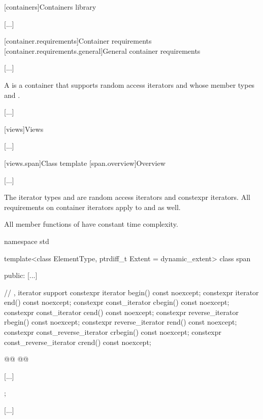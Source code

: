 
[containers]{Containers library}

[...]

\setcounter{section}{1}
[container.requirements]{Container requirements}
[container.requirements.general]{General container requirements}

[...]

\setcounter{Paras}{12}
\pnum
{}%
A 
is a container that supports random access iterators
and whose member types  and 
.

[...]

\setcounter{section}{6}
[views]{Views}

[...]

\setcounter{subsection}{2}
[views.span]{Class template }
[span.overview]{Overview}

[...]

\setcounter{Paras}{1}
\pnum
The iterator types  and  are
random access iterators and
constexpr iterators.
All requirements on container iterators apply to
 and  as well.

\pnum
All member functions of  have constant time complexity.

%
\begin{codeblock}
namespace std {
  template<class ElementType, ptrdiff_t Extent = dynamic_extent>
  class span {
  public:
    [...]

    // , iterator support
    constexpr iterator begin() const noexcept;
    constexpr iterator end() const noexcept;
    constexpr const_iterator cbegin() const noexcept;
    constexpr const_iterator cend() const noexcept;
    constexpr reverse_iterator rbegin() const noexcept;
    constexpr reverse_iterator rend() const noexcept;
    constexpr const_reverse_iterator crbegin() const noexcept;
    constexpr const_reverse_iterator crend() const noexcept;

    @@
    @@

    [...]
  };
}
\end{codeblock}

[...]
